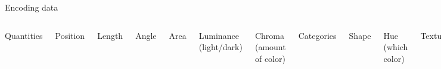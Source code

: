 \documentclass[aspectratio=169,12pt,t]{beamer}
\begin{document}
\begin{frame}{Encoding data}

\begin{columns}

{\hilit Quantities}

\bi
\item Position
\item Length
\item Angle
\item Area
\item Luminance {\lolit (light/dark)}
\item Chroma {\lolit (amount of color)}
\ei


{\hilit Categories}

\bi
\item Shape
\item Hue {\lolit (which color)}
\item Texture
\item Width
\ei

  \end{columns}

\note{
}
\end{frame}
\end{document}
